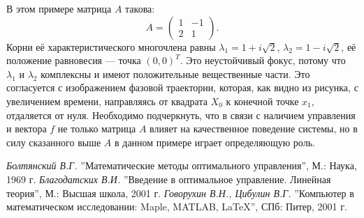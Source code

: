 \documentclass[12pt,titlepage]{article}
\begin{document}
В этом примере матрица $ A $ такова:
$$
A = \left( \begin{array}{cc}
      1 & -1 \\
      2 & 1
    \end{array} \right).
$$
Корни её характеристического многочлена равны $ \lambda_{1} = 1 + i\sqrt{2}$, $ \lambda_{2} = 1 - i\sqrt{2} $, её
положение равновесия --- точка $ (0, 0)^{T} $. Это неустойчивый фокус, потому что $ \lambda_{1} $ и
$ \lambda_{2} $ комплексны и имеют положительные вещественные части. Это согласуется с изображением
фазовой траектории, которая, как видно из рисунка, с увеличением времени, направляясь от квадрата $ X_{0} $
к конечной точке $ x_{1} $, отдаляется от нуля. Необходимо подчеркнуть, что в связи с
наличием управления и вектора $ f $ не только матрица $ A $ влияет на качественное поведение системы, но
в силу сказанного выше $ A $ в данном примере играет определяющую роль.



\newpage
\begin{thebibliography}{9}
 {\it Болтянский В.Г. }{\rm ''Математические методы оптимального управления'', М.: Наука, 1969 г.}
 {\it Благодатских В.И. }{\rm ''Введение в оптимальное управление. Линейная теория'', М.: Высшая школа, 2001 г.}
 {\it Говорухин В.Н., Цибулин В.Г. }{\rm ''Компьютер в математическом исследовании: Maple, MATLAB, LaTeX'', СПб: Питер, 2001 г.}
\end{thebibliography}
\end{document}

